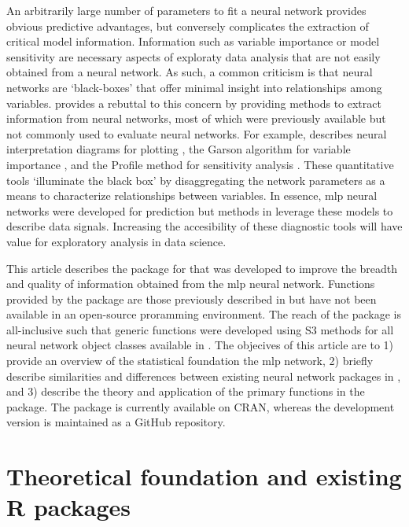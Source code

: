 \documentclass[article]{jss}\usepackage[]{graphicx}\usepackage[]{color}
\begin{document}
An arbitrarily large number of parameters to fit a neural network provides obvious predictive advantages, but conversely complicates the extraction of critical model information.  Information such as variable importance or model sensitivity are necessary aspects of exploraty data analysis that are not easily obtained from a neural network. As such, a common criticism is that neural networks are `black-boxes' that offer minimal insight into relationships among variables.  \citet{Olden02} provides a rebuttal to this concern by providing methods to extract information from neural networks, most of which were previously available but not commonly used to evaluate neural networks.  For example, \citet{Olden02} describes neural interpretation diagrams for plotting \citep{Ozesmi99}, the Garson algorithm for variable importance \citep{Garson91}, and the Profile method for sensitivity analysis \citep{Lek96}.  These quantitative tools `illuminate the black box' by disaggregating the network parameters as a means to characterize relationships between variables.  In essence, \ac{mlp} neural networks were developed for prediction but methods in \citep{Olden02} leverage these models to describe data signals.  Increasing the accesibility of these diagnostic tools will have value for exploratory analysis in data science.

This article describes the  package for  that was developed to improve the breadth and quality of information obtained from the \ac{mlp} neural network.  Functions provided by the package are those previously described in \citep{Olden02} but have not been available in an open-source proramming environment.  The reach of the package is all-inclusive such that generic functions were developed using S3 methods for all neural network object classes available in .  The objecives of this article are to 1) provide an overview of the statistical foundation the \ac{mlp} network, 2) briefly describe similarities and differences between existing neural network packages in , and 3) describe the theory and application of the primary functions in the  package.  The package is currently available on CRAN, whereas the development version is maintained as a GitHub repository.  

\section[Theoretical foundation]{Theoretical foundation and existing R packages}
\end{document}
